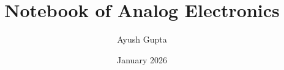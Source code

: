 \documentclass[openany,12pt]{book}
\begin{document}
  \title{Notebook of Analog Electronics}
  \author{Ayush Gupta}
  \date{January 2026}
  \maketitle
  \thispagestyle{plain}  %
  \tableofcontents

  
  
  
  
  
  
  
  
  
  

  \appendix
  
  
\end{document}
